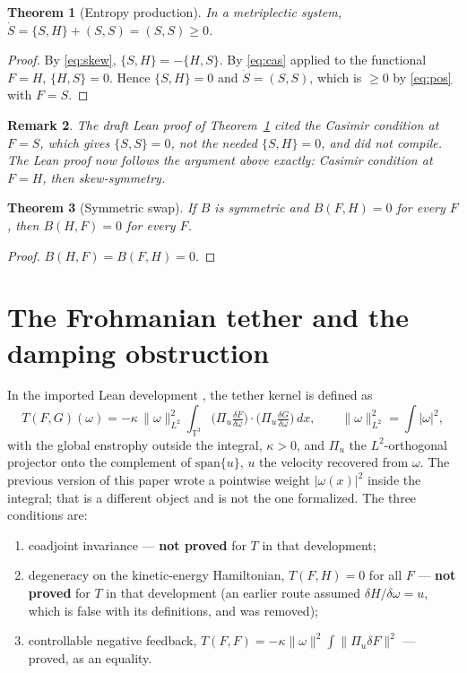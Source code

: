 \documentclass[11pt,a4paper]{article}
\newtheorem{theorem}{Theorem}[section]
\newtheorem{remark}[theorem]{Remark}
\begin{document}
\begin{theorem}[Entropy production]\label{thm:entropy}
In a metriplectic system, \(\dot S = \{S,H\} + (S,S) = (S,S) \ge 0\).
\end{theorem}
\begin{proof}
By \eqref{eq:skew}, \(\{S,H\} = -\{H,S\}\). By \eqref{eq:cas} applied to the functional \(F=H\),
\(\{H,S\}=0\). Hence \(\{S,H\}=0\) and \(\dot S=(S,S)\), which is \(\ge0\) by \eqref{eq:pos} with \(F=S\).
\end{proof}

\begin{remark}
The draft Lean proof of Theorem~\ref{thm:entropy} cited the Casimir condition at \(F=S\), which gives
\(\{S,S\}=0\), not the needed \(\{S,H\}=0\), and did not compile. The Lean proof now follows the argument
above exactly: Casimir condition at \(F=H\), then skew-symmetry.
\end{remark}

\begin{theorem}[Symmetric swap]\label{thm:swap}
If \(B\) is symmetric and \(B(F,H)=0\) for every \(F\), then \(B(H,F)=0\) for every \(F\).
\end{theorem}
\begin{proof}
\(B(H,F)=B(F,H)=0\).
\end{proof}

\section{The Frohmanian tether and the damping obstruction}\label{sec:tether}
In the imported Lean development \cite{Frohman2026}, the tether kernel is defined as
\begin{equation}
T(F,G)(\omega) = -\kappa\,\|\omega\|_{L^2}^2\int_{\mathbb{T}^3}
\bigl(\Pi_u\tfrac{\delta F}{\delta\omega}\bigr)\cdot
\bigl(\Pi_u\tfrac{\delta G}{\delta\omega}\bigr)\,dx,\qquad \|\omega\|_{L^2}^2=\int|\omega|^2,
\end{equation}
with the global enstrophy outside the integral, \(\kappa>0\), and \(\Pi_u\) the \(L^2\)-orthogonal
projector onto the complement of \(\mathrm{span}\{u\}\), \(u\) the velocity recovered from \(\omega\).
The previous version of this paper wrote a pointwise weight \(|\omega(x)|^2\) inside the integral;
that is a different object and is not the one formalized. The three conditions are:
\begin{enumerate}[label=(C\arabic*)]
\item coadjoint invariance --- \textbf{not proved} for \(T\) in that development;
\item degeneracy on the kinetic-energy Hamiltonian, \(T(F,H)=0\) for all \(F\) --- \textbf{not proved}
for \(T\) in that development (an earlier route assumed \(\delta H/\delta\omega=u\), which is false with
its definitions, and was removed);
\item controllable negative feedback, \(T(F,F)=-\kappa\|\omega\|^2\int\|\Pi_u\delta F\|^2\) --- proved, as an
equality.
\end{enumerate}
\end{document}

